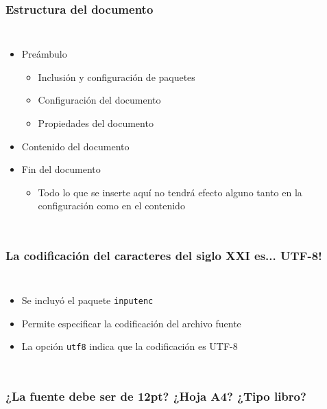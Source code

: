 \documentclass[svgnames]{beamer}
\begin{document}
\begin{frame}
  \frametitle{Estructura del documento}
  \begin{columns}
    \centering
      
    \centering
      \begin{itemize}
        \item Preámbulo
        \begin{itemize}
          \item Inclusión y configuración de paquetes
          \item Configuración del documento
          \item Propiedades del documento
        \end{itemize}
        \item Contenido del documento
        \item Fin del documento
        \begin{itemize}
          \item Todo lo que se inserte aquí no tendrá efecto alguno tanto en la configuración como en el contenido
        \end{itemize}
      \end{itemize}
  \end{columns}
\end{frame}

\begin{frame}
  \frametitle{La codificación del caracteres del siglo XXI es... UTF-8!}
  \begin{columns}
    \centering
      
    \centering
      \begin{itemize}
        \item Se incluyó el paquete \texttt{inputenc}
        \item Permite especificar la codificación del archivo fuente
        \item La opción \texttt{utf8} indica que la codificación es UTF-8
      \end{itemize}
  \end{columns}
\end{frame}

\begin{frame}
  \frametitle{¿La fuente debe ser de 12pt? ¿Hoja A4? ¿Tipo libro?}
  \centering
  
\end{frame}
\end{document}
